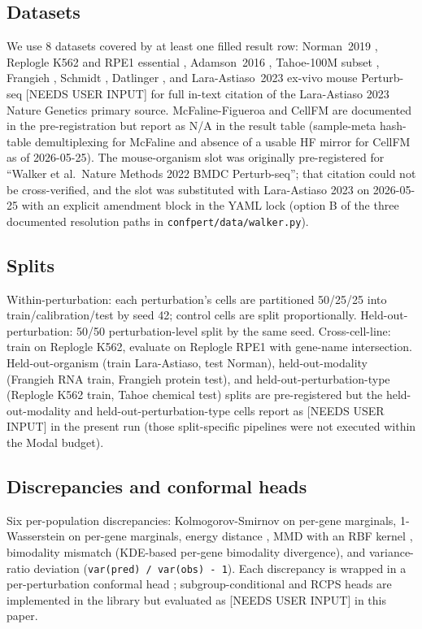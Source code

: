 \documentclass[11pt]{article}
\newcommand{\userinput}{{\color{orange}\textsf{[NEEDS USER INPUT]}}}
\begin{document}
\subsection{Datasets}
\label{sec:datasets}
We use 8 datasets covered by at least one filled result row:
Norman~2019 \cite{norman2019}, Replogle K562 and RPE1 essential
\cite{replogle2022}, Adamson~2016 \cite{adamson2016}, Tahoe-100M
subset \cite{tahoe2025}, Frangieh \cite{frangieh2021melanoma},
Schmidt \cite{schmidt2022crispr}, Datlinger \cite{datlinger2017crop},
and Lara-Astiaso~2023 ex-vivo mouse Perturb-seq \userinput{} for full
in-text citation of the Lara-Astiaso 2023 Nature Genetics primary
source. McFaline-Figueroa \cite{mcfaline2024sciplex} and CellFM
\cite{zeng2024cellfm} are documented in the pre-registration but report
as N/A in the result table (sample-meta hash-table demultiplexing for
McFaline and absence of a usable HF mirror for CellFM as of
2026-05-25). The mouse-organism slot was originally pre-registered for
``Walker et al.\ Nature Methods 2022 BMDC Perturb-seq''; that
citation could not be cross-verified, and the slot was substituted with
Lara-Astiaso 2023 on 2026-05-25 with an explicit amendment block in
the YAML lock (option B of the three documented resolution paths in
\texttt{confpert/data/walker.py}).

\subsection{Splits}
Within-perturbation: each perturbation's cells are partitioned 50/25/25
into train/calibration/test by seed 42; control cells are split
proportionally. Held-out-perturbation: 50/50 perturbation-level split
by the same seed. Cross-cell-line: train on Replogle K562, evaluate on
Replogle RPE1 with gene-name intersection. Held-out-organism (train
Lara-Astiaso, test Norman), held-out-modality (Frangieh RNA train,
Frangieh protein test), and held-out-perturbation-type (Replogle K562
train, Tahoe chemical test) splits are pre-registered but the
held-out-modality and held-out-perturbation-type cells report as
\userinput{} in the present run (those split-specific pipelines were
not executed within the Modal budget).

\subsection{Discrepancies and conformal heads}
Six per-population discrepancies: Kolmogorov-Smirnov on per-gene
marginals, 1-Wasserstein on per-gene marginals, energy distance
\cite{szekely2013}, MMD with an RBF kernel \cite{romano2019,
izbicki2022}, bimodality mismatch (KDE-based per-gene bimodality
divergence), and variance-ratio deviation
(\texttt{var(pred) / var(obs) - 1}). Each discrepancy is wrapped in a
per-perturbation conformal head
\cite{vovk2012,tibshirani2019,romano2019}; subgroup-conditional
\cite{cauchois2021} and RCPS \cite{bates2021} heads are implemented in
the library but evaluated as \userinput{} in this paper.
\end{document}
